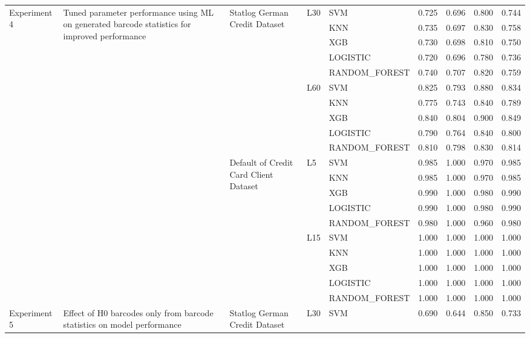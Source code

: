 \begin{table}
\begin{tabular}{lllllrrrr}
\cline{1-9} \cline{2-9} \cline{3-9} \cline{4-9}
\multirow[t]{20}{*}{Experiment 4} & \multirow[t]{20}{*}{Tuned parameter performance using ML on generated barcode statistics for improved performance} & \multirow[t]{10}{*}{Statlog German Credit Dataset} & \multirow[t]{5}{*}{L30} & SVM & 0.725 & 0.696 & 0.800 & 0.744 \\
 &  &  &  & KNN & 0.735 & 0.697 & 0.830 & 0.758 \\
 &  &  &  & XGB & 0.730 & 0.698 & 0.810 & 0.750 \\
 &  &  &  & LOGISTIC & 0.720 & 0.696 & 0.780 & 0.736 \\
 &  &  &  & RANDOM\_FOREST & 0.740 & 0.707 & 0.820 & 0.759 \\
\cline{4-9}
 &  &  & \multirow[t]{5}{*}{L60} & SVM & 0.825 & 0.793 & 0.880 & 0.834 \\
 &  &  &  & KNN & 0.775 & 0.743 & 0.840 & 0.789 \\
 &  &  &  & XGB & 0.840 & 0.804 & 0.900 & 0.849 \\
 &  &  &  & LOGISTIC & 0.790 & 0.764 & 0.840 & 0.800 \\
 &  &  &  & RANDOM\_FOREST & 0.810 & 0.798 & 0.830 & 0.814 \\
\cline{3-9} \cline{4-9}
 &  & \multirow[t]{10}{*}{Default of Credit Card Client Dataset} & \multirow[t]{5}{*}{L5} & SVM & 0.985 & 1.000 & 0.970 & 0.985 \\
 &  &  &  & KNN & 0.985 & 1.000 & 0.970 & 0.985 \\
 &  &  &  & XGB & 0.990 & 1.000 & 0.980 & 0.990 \\
 &  &  &  & LOGISTIC & 0.990 & 1.000 & 0.980 & 0.990 \\
 &  &  &  & RANDOM\_FOREST & 0.980 & 1.000 & 0.960 & 0.980 \\
\cline{4-9}
 &  &  & \multirow[t]{5}{*}{L15} & SVM & 1.000 & 1.000 & 1.000 & 1.000 \\
 &  &  &  & KNN & 1.000 & 1.000 & 1.000 & 1.000 \\
 &  &  &  & XGB & 1.000 & 1.000 & 1.000 & 1.000 \\
 &  &  &  & LOGISTIC & 1.000 & 1.000 & 1.000 & 1.000 \\
 &  &  &  & RANDOM\_FOREST & 1.000 & 1.000 & 1.000 & 1.000 \\
\cline{1-9} \cline{2-9} \cline{3-9} \cline{4-9}
\multirow[t]{20}{*}{Experiment 5} & \multirow[t]{20}{*}{Effect of H0 barcodes only from barcode statistics on model performance} & \multirow[t]{10}{*}{Statlog German Credit Dataset} & \multirow[t]{5}{*}{L30} & SVM & 0.690 & 0.644 & 0.850 & 0.733 \\

\end{tabular}
\end{table}
